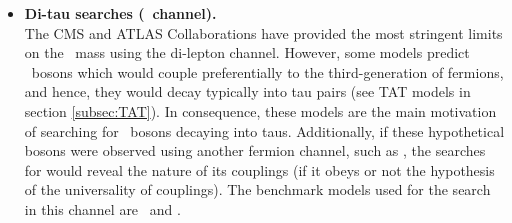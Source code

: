 \begin{itemize}

\item \textbf{Di-tau searches (\Zprimetotautau~channel).}\\

\noindent The CMS and ATLAS Collaborations have provided the most stringent limits on 
the \Zprime~mass using the di-lepton channel. However, some models predict 
\Zprime~bosons which would couple preferentially to the third-generation of fermions, and hence, 
they would decay typically into tau pairs (see TAT models in section \ref{subsec:TAT}). In 
consequence, these models are the main motivation of searching for \Zprime~bosons decaying into taus. 
Additionally, if these hypothetical bosons were observed using another fermion channel, such as \Zprimetoll, 
the searches for \Zprimetotautau would reveal the nature of its couplings (if it 
obeys or not the hypothesis of the universality of couplings). The benchmark models used 
for the search in this channel are \ZprimeSSM~and \ZprimeTAT. \\


\end{itemize}
